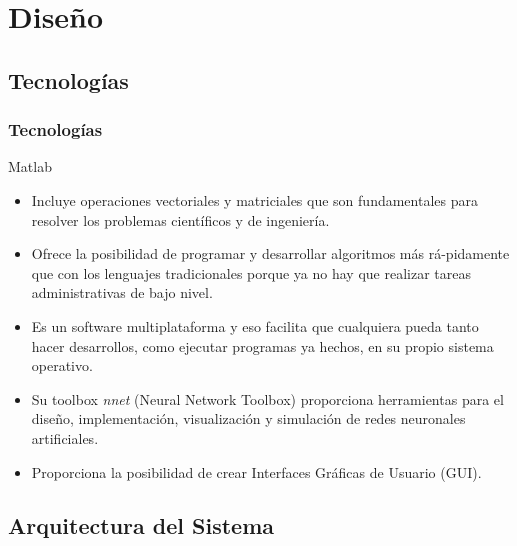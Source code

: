 \documentclass[compress,allowframebreaks]{beamer}
\begin{document}
	\section{Diseño}

		\subsection{Tecnologías}

			\begin{frame}
				\frametitle{\normalsize Tecnologías}
				
				\begin{block}{Matlab}
					\begin{itemize}\justifying
						\item \small Incluye operaciones vectoriales y matriciales que son fundamentales para resolver los problemas científicos y de ingeniería.
						\item \small Ofrece la posibilidad de programar y desarrollar algoritmos más rá-pidamente que con los lenguajes tradicionales porque ya no hay que realizar tareas administrativas de bajo nivel.
						\item \small Es un software multiplataforma y eso facilita que cualquiera pueda tanto hacer desarrollos, como ejecutar programas ya hechos, en su propio sistema operativo.
						\item \small Su toolbox \textit{nnet} (Neural Network Toolbox) proporciona herramientas para el diseño, implementación, visualización y simulación de redes neuronales artificiales.
						\item \small Proporciona la posibilidad de crear Interfaces Gráficas de Usuario
(GUI).
					\end{itemize}
				\end{block}
			\end{frame}

		\subsection{Arquitectura del Sistema}
\end{document}
